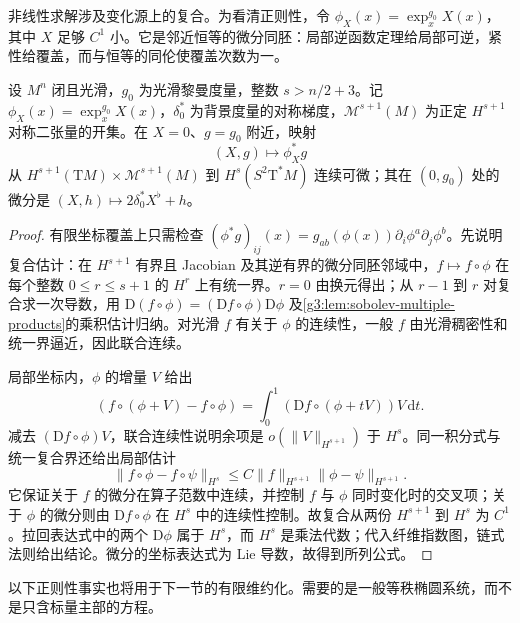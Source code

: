 非线性求解涉及变化源上的复合。为看清正则性，令
\(\phi_X(x)=\exp^{g_0}_xX(x)\)，其中 \(X\) 足够 \(C^1\) 小。它是邻近恒等的微分同胚：局部逆函数定理给局部可逆，紧性给覆盖，而与恒等的同伦使覆盖次数为一。

\begin{lemma}\label{g3:lem:metric-pullback-one-loss}
	设 \(M^n\) 闭且光滑，\(g_0\) 为光滑黎曼度量，整数 \(s>n/2+3\)。记 \(\phi_X(x)=\exp_x^{g_0}X(x)\)，\(\delta_0^*\) 为背景度量的对称梯度，\(\mathcal M^{s+1}(M)\) 为正定 \(H^{s+1}\) 对称二张量的开集。在 \(X=0\)、\(g=g_0\) 附近，映射
	\[
		(X,g)\longmapsto\phi_X^*g
	\]
	从 \(H^{s+1}(\mathrm TM)\times\mathcal M^{s+1}(M)\) 到 \(H^s(S^2\mathrm T^*M)\) 连续可微；其在 \((0,g_0)\) 处的微分是 \((X,h)\mapsto2\delta_0^*X^\flat+h\)。
\end{lemma}
\begin{proof}
	有限坐标覆盖上只需检查
	\((\phi^*g)_{ij}(x)=g_{ab}(\phi(x))\partial_i\phi^a\partial_j\phi^b\)。先说明复合估计：在 \(H^{s+1}\) 有界且 Jacobian 及其逆有界的微分同胚邻域中，\(f\mapsto f\circ\phi\) 在每个整数 \(0\le r\le s+1\) 的 \(H^r\) 上有统一界。\(r=0\) 由换元得出；从 \(r-1\) 到 \(r\) 对复合求一次导数，用 \(\mathrm D(f\circ\phi)=(\mathrm Df\circ\phi)\mathrm D\phi\) 及\cref{g3:lem:sobolev-multiple-products}的乘积估计归纳。对光滑 \(f\) 有关于 \(\phi\) 的连续性，一般 \(f\) 由光滑稠密性和统一界逼近，因此联合连续。

	局部坐标内，\(\phi\) 的增量 \(V\) 给出
	\[
		(f\circ(\phi+V)-f\circ\phi)
		=\int_0^1(\mathrm Df\circ(\phi+tV))V\,\mathrm dt.
	\]
	减去 \((\mathrm Df\circ\phi)V\)，联合连续性说明余项是 \(o(\|V\|_{H^{s+1}})\) 于 \(H^s\)。同一积分式与统一复合界还给出局部估计
	\[
		\|f\circ\phi-f\circ\psi\|_{H^s}
		\le C\|f\|_{H^{s+1}}\|\phi-\psi\|_{H^{s+1}}.
	\]
	它保证关于 \(f\) 的微分在算子范数中连续，并控制 \(f\) 与 \(\phi\) 同时变化时的交叉项；关于 \(\phi\) 的微分则由 \(\mathrm Df\circ\phi\) 在 \(H^s\) 中的连续性控制。故复合从两份 \(H^{s+1}\) 到 \(H^s\) 为 \(C^1\)。拉回表达式中的两个 \(\mathrm D\phi\) 属于 \(H^s\)，而 \(H^s\) 是乘法代数；代入纤维指数图，链式法则给出结论。微分的坐标表达式为 Lie 导数，故得到所列公式。
\end{proof}

以下正则性事实也将用于下一节的有限维约化。需要的是一般等秩椭圆系统，而不是只含标量主部的方程。

